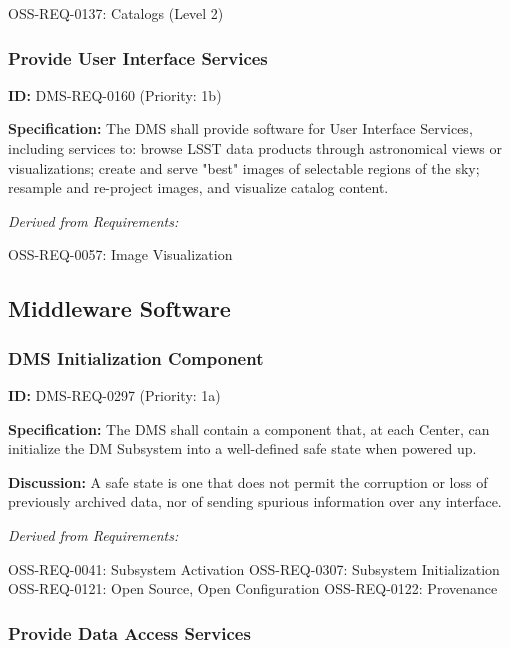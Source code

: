 \documentclass[SE,toc,lsstdraft]{lsstdoc}
\begin{document}
OSS-REQ-0137:
Catalogs (Level 2) \newline

\subsubsection{Provide User Interface Services}

\label{DMS-REQ-0160}
\textbf{ID:} DMS-REQ-0160 (Priority: 1b)

\textbf{Specification:} The DMS shall provide software for User Interface Services, including services to: browse LSST data products through astronomical views or visualizations; create and serve "best" images of selectable regions of the sky; resample and re-project images, and visualize catalog content.

\emph{Derived from Requirements:}

OSS-REQ-0057:
Image Visualization \newline

\subsection{Middleware Software}

\subsubsection{DMS Initialization Component}

\label{DMS-REQ-0297}
\textbf{ID:} DMS-REQ-0297 (Priority: 1a)

\textbf{Specification:} The DMS shall contain a component that, at each Center, can initialize the DM Subsystem into a well-defined safe state when powered up.

\textbf{Discussion: }A safe state is one that does not permit the corruption or loss of previously archived data, nor of sending spurious information over any interface.

\emph{Derived from Requirements:}

OSS-REQ-0041:
Subsystem Activation \newline
OSS-REQ-0307:
Subsystem Initialization \newline
OSS-REQ-0121:
Open Source, Open Configuration \newline
OSS-REQ-0122:
Provenance \newline

\subsubsection{Provide Data Access Services}
\end{document}
